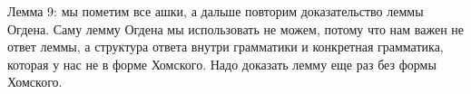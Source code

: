 	Лемма 9: мы пометим все ашки, а дальше повторим доказательство леммы Огдена.
	Саму лемму Огдена мы использовать не можем, потому что нам важен не ответ леммы, а структура ответа внутри грамматики и конкретная грамматика,
	которая у нас не в форме Хомского. Надо доказать лемму еще раз без формы Хомского.
